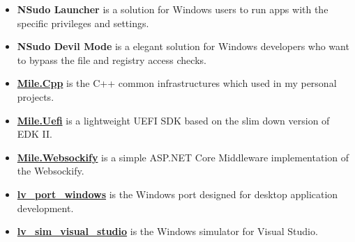 \documentclass{resume}
\begin{document}
\begin{itemize}
  \item \textbf{NSudo Launcher} is a solution for Windows users to run apps with the specific privileges and settings.
  \item \textbf{NSudo Devil Mode} is a elegant solution for Windows developers who want to bypass the file and registry access checks.
\end{itemize}

\begin{itemize}
  \item \href{https://github.com/ProjectMile/Mile.Cpp}{\textbf{Mile.Cpp}} is the C++ common infrastructures which used in my personal projects.
  \item \href{https://github.com/ProjectMile/Mile.Uefi}{\textbf{Mile.Uefi}} is a lightweight UEFI SDK based on the slim down version of EDK II.
  \item \href{https://github.com/ProjectMile/Mile.Websockify}{\textbf{Mile.Websockify}} is a simple ASP.NET Core Middleware implementation of the Websockify.
\end{itemize}

\begin{itemize}
  \item \href{https://github.com/lvgl/lv_port_windows}{\textbf{lv\_port\_windows}} is the Windows port designed for desktop application development.
  \item \href{https://github.com/lvgl/lv_sim_visual_studio}{\textbf{lv\_sim\_visual\_studio}} is the Windows simulator for Visual Studio.
\end{itemize}
\end{document}
